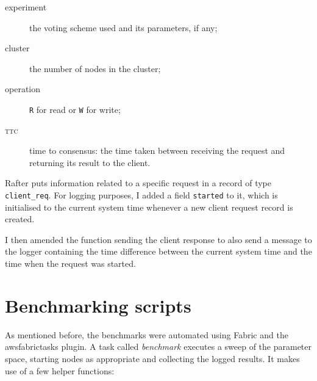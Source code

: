 \documentclass[11pt,chapterprefix=true,toc=bibliography,numbers=noendperiod,
               footnotes=multiple,twoside]{scrreprt}
\begin{document}
\begin{description}
    \item[experiment] the voting scheme used and its parameters, if any;
    \item[cluster] the number of nodes in the cluster;
    \item[operation] \texttt{R} for read or \texttt{W} for write;
    \item[\textsc{ttc}] time to consensus: the time taken between receiving the request and returning its result to the client.
\end{description}

Rafter puts information related to a specific request in a record of type \texttt{client\_req}. For logging purposes, I added a field \texttt{started} to it, which is initialised to the current system time whenever a new client request record is created.

I then amended the function sending the client response to also send a message to the logger containing the time difference between the current system time and the time when the request was started.

\section{Benchmarking scripts\label{sc:benchmarking-scripts}}

As mentioned before, the benchmarks were automated using Fabric and the awsfabrictasks plugin. A task called \textit{benchmark} executes a sweep of the parameter space, starting nodes as appropriate and collecting the logged results. It makes use of a few helper functions:
\end{document}
